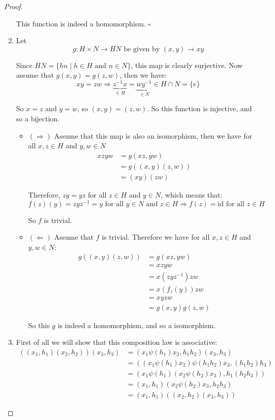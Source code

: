 \begin{exercise}
\begin{proof}
\begin{enumerate}[label = (\alph*)]
This function is indeed a homomorphism.
\newline $\square$
\item Let \[g\colon H\times N\rightarrow HN \text{ be given by }(x,y) \rightarrow xy\]

Since $HN = \{hn\mid h\in H\text{ and }n\in N\}$, this map is clearly surjective. Now assume that $g(x,y) = g(z,w)$, then we have:\begin{equation*}
xy=zw \Rightarrow \underbrace{z^{-1}x}_{\in H} = \underbrace{wy^{-1}}_{\in N}\in H \cap N = \{e\}
\end{equation*}

So $x=z$ and $y=w$, so $(x,y)=(z,w)$. So this function is injective, and so a bijection.

\begin{itemize}
\item $(\Rightarrow)$ Assume that this map is also an isomorphism, then we have for all $x,z\in H$ and $y,w\in N$ \begin{align*}
xzyw &= g(xz,yw)\\
&= g((x,y)(z,w))\\
&= (xy)(zw)
\end{align*}

Therefore, $zy = yz$ for all $z\in H$ and $y\in N$, which means that:\begin{equation*}
f(z)(y) = zyz^{-1} = y \text{ for all }y\in N\text{ and }z\in H \Rightarrow f(z) = \text{id} \text{ for all }z\in H
\end{equation*}

So $f$ is trivial.
\item $(\Leftarrow)$ Assume that $f$ is trivial.
    Therefore we have for all $x,z\in H$ and $y,w\in N$:\begin{align*}
g((x,y)(z,w)) &= g(xz,yw)\\
&= xzyw\\
&= x(zyz^{-1})zw\\
&= x(f_z(y))zw\\
&= xyzw\\
&= g(x,y)g(z,w)
\end{align*}

So this $g$ is indeed a homomorphism, and so a isomorphism. 
\end{itemize}
\item First of all we will show that this composition law is associative:\begin{align*}
((x_1,h_1)(x_2,h_2))(x_3,h_3) &= ({x_1}{\psi(h_1)x_2}, h_1h_2)(x_3,h_3)\\
&= (({x_1}{\psi(h_1)x_2}){\psi(h_1h_2)x_3}, (h_1h_2)h_3)\\
&= ({x_1}\psi(h_1)({x_2}{\psi(h_2)x_3}), h_1(h_2h_3))\\
&=(x_1,h_1)({x_2}{\psi(h_2)x_3}, h_2h_3)\\
&=(x_1,h_1)((x_2,h_2)(x_3,h_3))
\end{align*}


\end{enumerate}
\end{proof}
\end{exercise}
